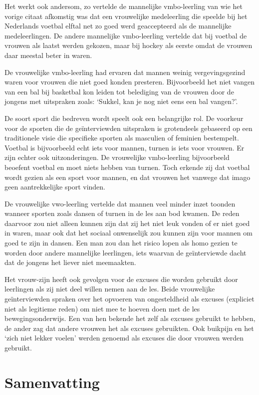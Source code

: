 \documentclass[a4paper,12pt]{memoir}
\begin{document}
Het werkt ook andersom, zo vertelde de mannelijke vmbo-leerling van wie het vorige citaat afkomstig was dat een vrouwelijke medeleerling die speelde bij het Nederlands voetbal elftal net zo goed werd geaccepteerd als de mannelijke medeleerlingen. De andere mannelijke vmbo-leerling vertelde dat bij voetbal de vrouwen als laatst werden gekozen, maar bij hockey als eerste omdat de vrouwen daar meestal beter in waren. 

De vrouwelijke vmbo-leerling had ervaren dat mannen weinig vergevingsgezind waren voor vrouwen die niet goed konden presteren. Bijvoorbeeld het niet vangen van een bal bij basketbal kon leiden tot belediging van de vrouwen door de jongens met uitspraken zoals: `Sukkel, kan je nog niet eens een bal vangen?'.

De soort sport die bedreven wordt speelt ook een belangrijke rol. De voorkeur voor de sporten die de geïnterviewden uitspraken is grotendeels gebaseerd op een traditionele visie die specifieke sporten als masculien of feminien bestempelt. Voetbal is bijvoorbeeld echt iets voor mannen, turnen is iets voor vrouwen. Er zijn echter ook uitzonderingen. De vrouwelijke vmbo-leerling bijvoorbeeld beoefent voetbal en moet niets hebben van turnen. Toch erkende zij dat voetbal wordt gezien als een sport voor mannen, en dat vrouwen het vanwege dat imago geen aantrekkelijke sport vinden. 

De vrouwelijke vwo-leerling vertelde dat mannen veel minder inzet toonden wanneer sporten zoals dansen of turnen in de les aan bod kwamen. De reden daarvoor zou niet alleen kunnen zijn dat zij het niet leuk vonden of er niet goed in waren, maar ook dat het sociaal onwenselijk zou kunnen zijn voor mannen om goed te zijn in dansen. Een man zou dan het risico lopen als homo gezien te worden door andere mannelijke leerlingen, iets waarvan de geïnterviewde dacht dat de jongens het liever niet meemaakten.

Het vrouw-zijn heeft ook gevolgen voor de excuses die worden gebruikt door leerlingen als zij niet deel willen nemen aan de les. Beide vrouwelijke geïnterviewden spraken over het opvoeren van ongesteldheid als excuses (expliciet niet als legitieme reden) om niet mee te hoeven doen met de les bewegingsonderwijs. Een van hen bekende het zelf als excuses gebruikt te hebben, de ander zag dat andere vrouwen het als excuses gebruikten. Ook buikpijn en het `zich niet lekker voelen' werden genoemd als excuses die door vrouwen werden gebruikt.

\section{Samenvatting}
\end{document}
